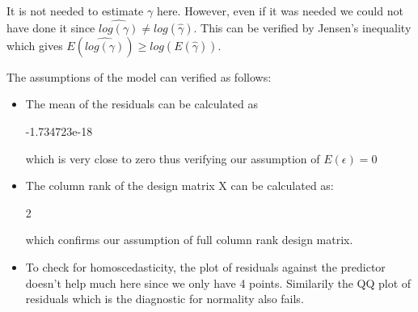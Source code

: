 \documentclass[12pt]{article}
\begin{document}
It is not needed to estimate $\gamma$ here. However, even if it was needed we could not have done it since $\widehat{log(\gamma)} \neq log(\hat{\gamma})$. This can be verified by Jensen's inequality which gives $E(\widehat{log(\gamma)}) \geq log(E(\hat{\gamma}))$.
\item The assumptions of the model can verified as follows:
\begin{itemize}
\item The mean of the residuals can be calculated as
\begin{Schunk}
\begin{Soutput}
[1] -1.734723e-18
\end{Soutput}
\end{Schunk}
which is very close to zero thus verifying our assumption of $E(\epsilon)=0$
\item The column rank of the design matrix X can be calculated as:
\begin{Schunk}
\begin{Soutput}
[1] 2
\end{Soutput}
\end{Schunk}
which confirms our assumption of full column rank design matrix.
\item To check for homoscedasticity, the plot of residuals against the predictor doesn't help much here since we only have 4 points. Similarily the QQ plot of residuals which is the diagnostic for normality also fails.
\clearpage


\end{itemize}
\end{document}
